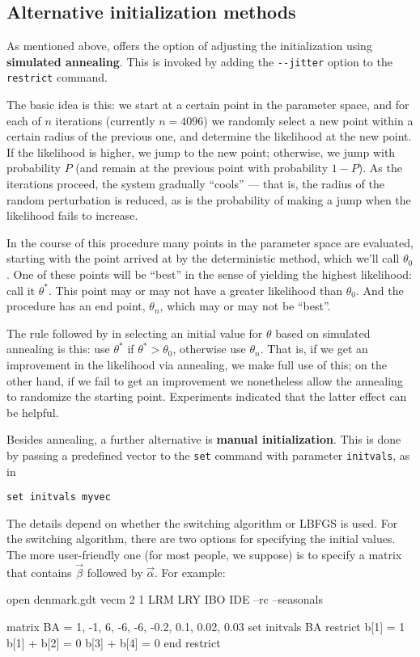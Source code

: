 \subsection{Alternative initialization methods}
\label{sec:vecm-alt-init}

As mentioned above,  offers the option of adjusting the
initialization using \textbf{simulated annealing}.  This is invoked by
adding the \verb|--jitter| option to the \texttt{restrict} command.

The basic idea is this: we start at a certain point in the parameter
space, and for each of $n$ iterations (currently $n=4096$) we randomly
select a new point within a certain radius of the
previous one, and determine the likelihood at the new point.  If the
likelihood is higher, we jump to the new point; otherwise, we jump
with probability $P$ (and remain at the previous point with
probability $1-P$).  As the iterations proceed, the system gradually
``cools'' --- that is, the radius of the random perturbation is
reduced, as is the probability of making a jump when the likelihood
fails to increase.

In the course of this procedure many points in the parameter space are
evaluated, starting with the point arrived at by the deterministic
method, which we'll call $\theta_0$.  One of these points will be
``best'' in the sense of yielding the highest likelihood: call it
$\theta^*$.  This point may or may not have a greater likelihood than
$\theta_0$.  And the procedure has an end point, $\theta_n$, which may
or may not be ``best''.

The rule followed by  in selecting an initial value for $\theta$
based on simulated annealing is this: use $\theta^*$ if $\theta^* >
\theta_0$, otherwise use $\theta_n$.  That is, if we get an
improvement in the likelihood via annealing, we make full use of this;
on the other hand, if we fail to get an improvement we nonetheless
allow the annealing to randomize the starting point.  Experiments
indicated that the latter effect can be helpful.

Besides annealing, a further alternative is \textbf{manual
  initialization}.  This is done by passing a predefined vector to the
\texttt{set} command with parameter \texttt{initvals}, as in
%
\begin{verbatim}
set initvals myvec
\end{verbatim}

The details depend on whether the switching algorithm or LBFGS is
used.  For the switching algorithm, there are two options for
specifying the initial values.  The more user-friendly one (for most
people, we suppose) is to specify a matrix that contains $\vec{\beta}$
followed by $\vec{\alpha}$. For example:
\begin{code}
open denmark.gdt
vecm 2 1 LRM LRY IBO IDE --rc --seasonals

matrix BA = {1, -1, 6, -6, -6, -0.2, 0.1, 0.02, 0.03}
set initvals BA
restrict
  b[1] = 1
  b[1] + b[2] = 0
  b[3] + b[4] = 0
end restrict
\end{code}

